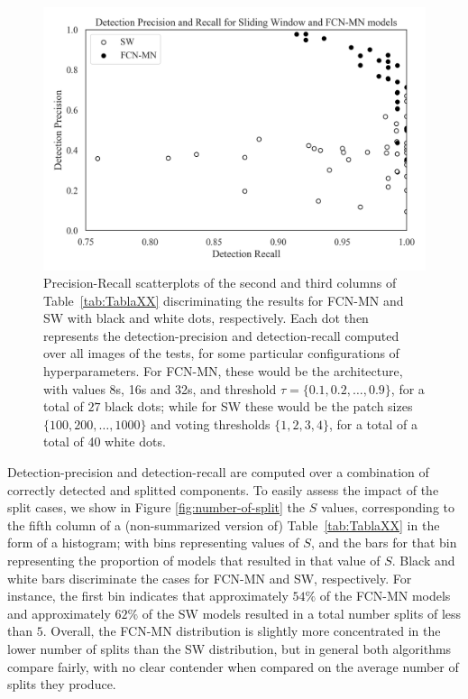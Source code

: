 \documentclass[a4paper,authoryear,review]{elsarticle}
\begin{document}
 \begin{figure}
	\centering
	\includegraphics[width=\textwidth]{figures/111_precision_recall_detection.png}
	\caption{Precision-Recall scatterplots of the second and third columns of Table~\ref{tab:TablaXX} discriminating the results for FCN-MN and SW with black and white dots, respectively. Each dot then  represents the detection-precision and detection-recall computed over all images of the tests, for some particular  configurations of hyperparameters. For FCN-MN, these would be the architecture, with values 8s, 16s and 32s, and threshold $\tau = \{0.1, 0.2, \ldots, 0.9\}$,  for a total of $27$ black dots; while for SW these would be the patch sizes  $\{100, 200, \ldots, 1000\}$ and voting thresholds $\{1, 2, 3, 4\}$, for a total of a total of 40 white dots.}
	\label{fig:detection-scatter-plot}
\end{figure}

Detection-precision and detection-recall are computed over a combination of correctly detected and splitted components. To easily assess the impact of the split cases, we show in Figure \ref{fig:number-of-split} the $S$ values, corresponding to  the fifth column of a   (non-summarized version of) Table~\ref{tab:TablaXX} in the form of a histogram; with bins representing values of $S$,  and the bars for that bin representing the proportion of models that resulted in that value of $S$. Black and white bars discriminate the cases for FCN-MN and SW, respectively. For instance, the first bin indicates that approximately $54\%$ of the FCN-MN models and approximately $62\%$ of the SW models resulted in a total number splits of less than $5$. Overall, the FCN-MN distribution is slightly more concentrated in the lower number of splits than the SW distribution, but in general both algorithms compare fairly, with no clear contender when compared on the average number of splits they produce. 
\end{document}
